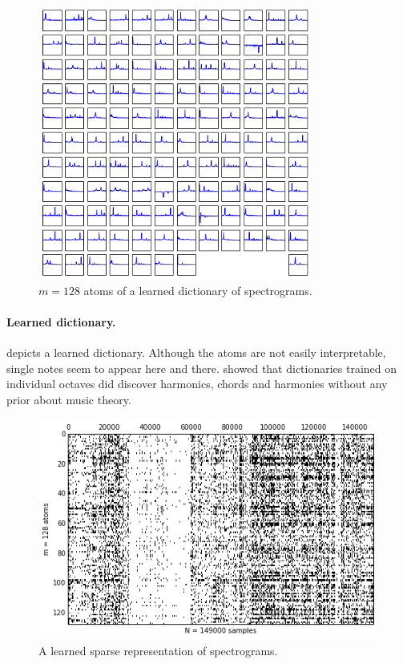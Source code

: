 \begin{figure}[ht]
	\centering
	\includegraphics[width=9cm]{img/dictionary}
	\caption[]{$m=128$ atoms of a learned dictionary of spectrograms.}
	\label{fig:dictionary}
\end{figure}

\paragraph{Learned dictionary.}
 depicts a learned dictionary. Although the atoms are not easily interpretable, single notes seem to appear here and there. \cite{lecun2010PSD} showed that dictionaries trained on individual octaves did discover harmonics, chords and harmonies without any prior about music theory.

\begin{figure}[ht]
	\centering
	\includegraphics[width=\textwidth]{img/sparse_representations}
	\caption[]{A learned sparse representation of spectrograms.}
	\label{fig:sparse_representations}
\end{figure}

